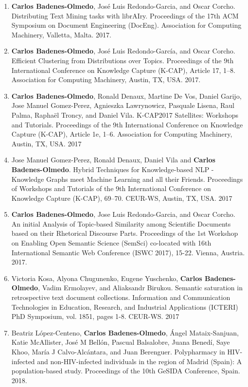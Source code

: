 \begin{enumerate}
\item \textbf{Carlos Badenes-Olmedo}, José Luis Redondo-Garcia, and Oscar Corcho. Distributing Text Mining tasks with librAIry. Proceedings of the 17th ACM Symposium on Document Engineering (DocEng). Association for Computing Machinery, Valletta, Malta. 2017.
\item \textbf{Carlos Badenes-Olmedo}, José Luis Redondo-García, and Oscar Corcho. Efficient Clustering from Distributions over Topics. Proceedings of the 9th International Conference on Knowledge Capture (K-CAP), Article 17, 1–8. Association for Computing Machinery, Austin, TX, USA. 2017.
\item \textbf{Carlos Badenes-Olmedo}, Ronald Denaux, Martine De Vos, Daniel Garijo, Jose Manuel Gomez-Perez, Agnieszka Lawrynowicz, Pasquale Lisena, Raul Palma, Raphaël Troncy, and Daniel Vila. K-CAP2017 Satellites: Workshops and Tutorials. Proceedings of the 9th International Conference on Knowledge Capture (K-CAP), Article 1e, 1–6. Association for Computing Machinery, Austin, TX, USA. 2017
\item Jose Manuel Gomez-Perez, Ronald Denaux, Daniel Vila and \textbf{Carlos Badenes-Olmedo}. Hybrid Techniques for Knowledge-based NLP - Knowledge Graphs meet Machine Learning and all their Friends. Proceedings of Workshops and Tutorials of the 9th International Conference on Knowledge Capture (K-CAP), 69–70. CEUR-WS, Austin, TX, USA. 2017
\item \textbf{Carlos Badenes-Olmedo}, Jose Luis Redondo-Garcia, and Oscar Corcho. An initial Analysis of Topic-based Similarity among Scientific Documents based on their Rhetorical Discourse Parts. Proceedings of the 1st Workshop on Enabling Open Semantic Science (SemSci) co-located with 16th International Semantic Web Conference (ISWC 2017), 15-22. Vienna, Austria. 2017.
\item Victoria Kosa, Alyona Chugunenko, Eugene Yuschenko, \textbf{Carlos Badenes-Olmedo}, Vadim Ermolayev, and Aliaksandr Birukou. Semantic saturation in retrospective text document collections. Information and Communication Technologies in Education, Research, and Industrial Applications (ICTERI) PhD Symposium, vol. 1851, pages 1-8. CEUR-WS. 2017
\item Beatriz López-Centeno, \textbf{Carlos Badenes-Olmedo}, Ángel Mataix-Sanjuan, Katie McAllister, José M Bellón, Pascual Balsalobre,  Juana Benedí, Saye Khoo, María J Calvo-Alcántara, and Juan Berenguer. Polypharmacy in HIV-infected and non-HIV-infected individuals in the region of Madrid (Spain): A population-based study. Proceedings of the 10th GeSIDA Conference, Spain. 2018.

\end{enumerate}
